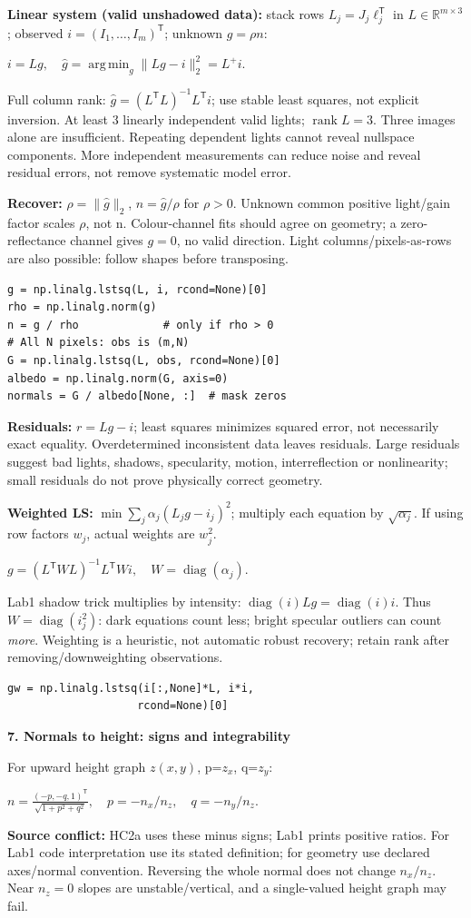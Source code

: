 \documentclass[a4paper]{article}
\newcommand{\key}[1]{\textbf{#1}}
\newcommand{\Topic}[1]{\par\vspace{1.7pt}\noindent
  {\fontsize{7.7}{8.0}\selectfont\bfseries #1}\par\vspace{0.3pt}}
\newcommand{\eq}[1]{\par\noindent\mbox{\(\displaystyle #1\)}\par}
\newcommand{\norm}[1]{\lVert #1\rVert}
\newcommand{\trans}{^{\mathsf T}}
\newcommand{\inv}{^{-1}}
\newcommand{\R}{\mathbb R}
\newcommand{\diag}{\operatorname{diag}}
\newcommand{\argmin}{\operatorname*{arg\,min}}
\newcounter{sheet}
\newcounter{sheetcolumn}
\newlength{\colwidth}
\newenvironment{sheetcol}[1][7.0]{\stepcounter{sheetcolumn}
  \begin{lrbox}{\columnbox}\begin{minipage}[t]{\colwidth}\vspace{0pt}
  \fontsize{#1}{\dimexpr#1pt+0.6pt\relax}\selectfont}
  {\end{minipage}\end{lrbox}
  \typeout{CV1COL|\thesheet|\thesheetcolumn|\the\dimexpr\ht\columnbox+\dp\columnbox\relax}
  \usebox{\columnbox}\ignorespacesafterend}
\begin{document}
\begin{sheetcol}[6.4]
\key{Linear system (valid unshadowed data):} stack rows \(L_j=J_j\ell_j\trans\) in \(L\in\R^{m\times3}\); observed \(i=(I_1,\ldots,I_m)\trans\); unknown \(g=\rho n\):
\eq{i=Lg,\quad \hat g=\argmin_g\norm{Lg-i}_2^2=L^+i.}
Full column rank: \(\hat g=(L\trans L)\inv L\trans i\); use stable least squares, not explicit inversion. At least 3 linearly independent valid lights; \(\operatorname{rank}L=3\). Three images alone are insufficient. Repeating dependent lights cannot reveal nullspace components. More independent measurements can reduce noise and reveal residual errors, not remove systematic model error.

\key{Recover:} \(\rho=\norm{\hat g}_2\), \(n=\hat g/\rho\) for \(\rho>0\). Unknown common positive light/gain factor scales \(\rho\), not n. Colour-channel fits should agree on geometry; a zero-reflectance channel gives \(g=0\), no valid direction. Light columns/pixels-as-rows are also possible: follow shapes before transposing.
\begin{lstlisting}
g = np.linalg.lstsq(L, i, rcond=None)[0]
rho = np.linalg.norm(g)
n = g / rho             # only if rho > 0
# All N pixels: obs is (m,N)
G = np.linalg.lstsq(L, obs, rcond=None)[0]
albedo = np.linalg.norm(G, axis=0)
normals = G / albedo[None, :]  # mask zeros
\end{lstlisting}
\key{Residuals:} \(r=Lg-i\); least squares minimizes squared error, not necessarily exact equality. Overdetermined inconsistent data leaves residuals. Large residuals suggest bad lights, shadows, specularity, motion, interreflection or nonlinearity; small residuals do not prove physically correct geometry.

\key{Weighted LS:} \(\min\sum_j\alpha_j(L_jg-i_j)^2\); multiply each equation by \(\sqrt{\alpha_j}\). If using row factors \(w_j\), actual weights are \(w_j^2\).
\eq{g=(L\trans WL)\inv L\trans Wi,\quad W=\diag(\alpha_j).}
Lab1 shadow trick multiplies by intensity: \(\diag(i)Lg=\diag(i)i\). Thus \(W=\diag(i_j^2)\): dark equations count less; bright specular outliers can count \emph{more}. Weighting is a heuristic, not automatic robust recovery; retain rank after removing/downweighting observations.
\begin{lstlisting}
gw = np.linalg.lstsq(i[:,None]*L, i*i,
                    rcond=None)[0]
\end{lstlisting}
\Topic{7. Normals to height: signs and integrability}
For upward height graph \(z(x,y)\), p=\(z_x\), q=\(z_y\):
\eq{n=\frac{(-p,-q,1)\trans}{\sqrt{1+p^2+q^2}},\quad
 p=-n_x/n_z,\quad q=-n_y/n_z.}
\key{Source conflict:} HC2a uses these minus signs; Lab1 prints positive ratios. For Lab1 code interpretation use its stated definition; for geometry use declared axes/normal convention. Reversing the whole normal does not change \(n_x/n_z\). Near \(n_z=0\) slopes are unstable/vertical, and a single-valued height graph may fail.


\end{sheetcol}
\end{document}
